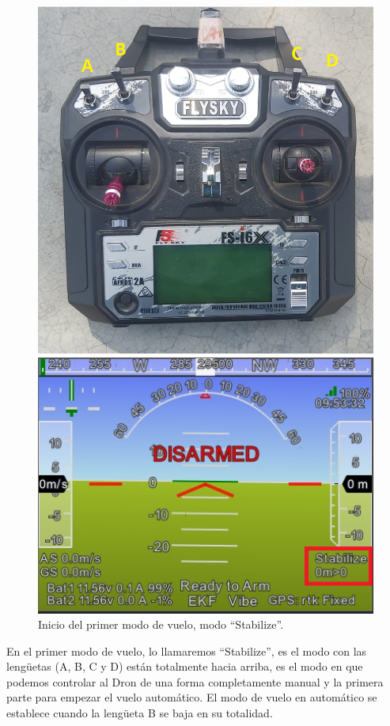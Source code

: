 \begin{figure}[h]
	\centering
	\begin{minipage}[b]{0.4\textwidth}
		\centering
		\includegraphics[width=\textwidth]{imagenes/ctr3}
	\end{minipage}
	\hspace{0.05\textwidth} %
	\begin{minipage}[b]{0.5\textwidth}
		\centering
		\includegraphics[width=1.1\textwidth]{imagenes/mp1}
	\end{minipage}
	\caption{Inicio del primer modo de vuelo, modo “Stabilize”.}
	\label{fig:modo_stabilize}
\end{figure}
\newpage
En el primer modo de vuelo, lo llamaremos “Stabilize”, es el modo con las lengüetas (A, B, C y D) están totalmente hacia arriba, es el modo en que podemos controlar al Dron de una forma completamente manual y la primera parte para empezar el vuelo automático.
El modo de vuelo en automático se establece cuando la lengüeta B se baja en su totalidad.


